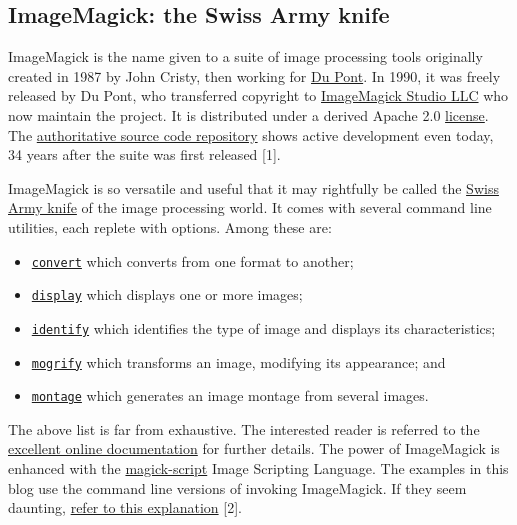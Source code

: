 \documentclass[
  11pt,
  british,
  a4paper,
]{article}
\providecommand{\tightlist}{%
  \setlength{\itemsep}{0pt}\setlength{\parskip}{0pt}}
\begin{document}
\hypertarget{imagemagick-the-swiss-army-knife}{%
\subsection{ImageMagick: the Swiss Army
knife}\label{imagemagick-the-swiss-army-knife}}

ImageMagick is the name given to a suite of image processing tools
originally created in 1987 by John Cristy, then working for
\href{https://www.dupont.com/}{Du Pont}. In 1990, it was freely released
by Du Pont, who transferred copyright to
\href{https://imagemagick.org/script/contact.php}{ImageMagick Studio
LLC} who now maintain the project. It is distributed under a derived
Apache 2.0 \href{https://imagemagick.org/script/license.php}{license}.
The \href{https://github.com/ImageMagick/ImageMagick}{authoritative
source code repository} shows active development even today, 34 years
after the suite was first released {[}1{]}.

ImageMagick is so versatile and useful that it may rightfully be called
the \href{https://www.thefreedictionary.com/Swiss-army+knife}{Swiss Army
knife} of the image processing world. It comes with several command line
utilities, each replete with options. Among these are:

\begin{itemize}
\tightlist
\item
  \href{https://imagemagick.org/script/convert.php}{\texttt{convert}}
  which converts from one format to another;
\item
  \href{https://imagemagick.org/script/display.php}{\texttt{display}}
  which displays one or more images;
\item
  \href{https://imagemagick.org/script/identify.php}{\texttt{identify}}
  which identifies the type of image and displays its characteristics;
\item
  \href{https://imagemagick.org/script/mogrify.php}{\texttt{mogrify}}
  which transforms an image, modifying its appearance; and
\item
  \href{https://imagemagick.org/script/montage.php}{\texttt{montage}}
  which generates an image montage from several images.
\end{itemize}

The above list is far from exhaustive. The interested reader is referred
to the
\href{https://imagemagick.org/script/command-line-tools.php}{excellent
online documentation} for further details. The power of ImageMagick is
enhanced with the
\href{https://imagemagick.org/script/magick-script.php}{magick-script}
Image Scripting Language. The examples in this blog use the command line
versions of invoking ImageMagick. If they seem daunting,
\href{https://imagemagick.org/script/command-line-processing.php}{refer
to this explanation} {[}2{]}.
\end{document}
